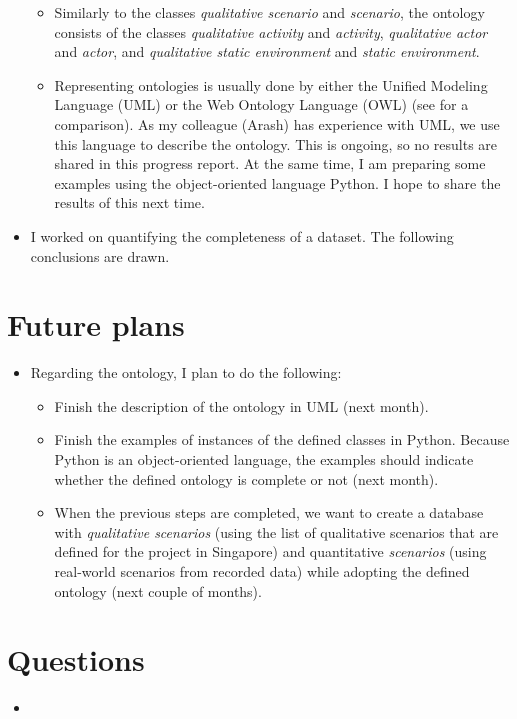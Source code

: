 \documentclass[10pt,final,a4paper,oneside,onecolumn]{article}
\begin{document}
\begin{itemize}
\begin{itemize}
		\item Similarly to the classes \emph{qualitative scenario} and \emph{scenario}, the ontology consists of the classes \emph{qualitative activity} and \emph{activity}, \emph{qualitative actor} and \emph{actor}, and \emph{qualitative static environment} and \emph{static environment}. 
		
		\item Representing ontologies is usually done by either the Unified Modeling Language (UML) or the Web Ontology Language (OWL) (see \cite{atkinson2005detailed} for a comparison). As my colleague (Arash) has experience with UML, we use this language to describe the ontology. This is ongoing, so no results are shared in this progress report. At the same time, I am preparing some examples using the object-oriented language Python. I hope to share the results of this next time.
	\end{itemize}

	\item I worked on quantifying the completeness of a dataset. The following conclusions are drawn.
\end{itemize}

\section{Future plans}

\begin{itemize}
	\item Regarding the ontology, I plan to do the following:
	\begin{itemize}
		\item Finish the description of the ontology in UML (next month).
		\item Finish the examples of instances of the defined classes in Python. Because Python is an object-oriented language, the examples should indicate whether the defined ontology is complete or not (next month).
		\item When the previous steps are completed, we want to create a database with \emph{qualitative scenarios} (using the list of qualitative scenarios that are defined for the project in Singapore) and quantitative \emph{scenarios} (using real-world scenarios from recorded data) while adopting the defined ontology (next couple of months).
	\end{itemize}
\end{itemize}

\section{Questions}

\begin{itemize}
	\item 
\end{itemize}


\printbibliography
\end{document}

